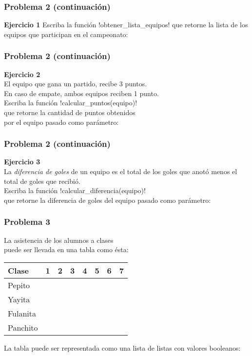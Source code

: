 \documentclass[12pt]{beamer}
\newcommand{\T}{\ding{51}}
\newcommand{\F}{}
\begin{document}
  \begin{frame}
    \frametitle{Problema 2 (continuación)}
    \label{problema-futbol-2}
    \textbf{Ejercicio 1}
    Escriba la función \li!obtener_lista_equipos!
    que retorne la lista de los equipos
    que participan en el campeonato:
    
  \end{frame}

  \begin{frame}
    \frametitle{Problema 2 (continuación)}
    \label{problema-futbol-3}
    \textbf{Ejercicio 2} \\
    El equipo que gana un partido, recibe 3 puntos. \\
    En caso de empate, ambos equipos reciben 1 punto. \\
    \vspace{1ex}
    Escriba la función \li!calcular_puntos(equipo)! \\
    que retorne la cantidad de puntos obtenidos \\
    por el equipo pasado como parámetro:
    
  \end{frame}

  \begin{frame}
    \frametitle{Problema 2 (continuación)}
    \label{problema-futbol-4}
    \textbf{Ejercicio 3} \\
    La \emph{diferencia de goles} de un equipo
    es el total de los goles que anotó menos el total de goles que recibió. \\
    \vspace{1ex}
    Escriba la función \li!calcular_diferencia(equipo)! \\
    que retorne la diferencia de goles
    del equipo pasado como parámetro:
    
  \end{frame}

  \begin{frame}
    \frametitle{Problema 3}
    \label{problema-asistencia-1}
    La asistencia de los alumnos a clases \\
    puede ser llevada en una tabla como ésta:
    {\footnotesize
    \begin{tabular}{|l|c|c|c|c|c|c|c|}\hline
      Clase    & 1& 2& 3& 4& 5& 6& 7\\\hline\hline
      Pepito   &\T&\T&\T&\F&\F&\F&\F\\\hline
      Yayita   &\T&\T&\T&\F&\T&\F&\T\\\hline
      Fulanita &\T&\T&\T&\T&\T&\T&\T\\\hline
      Panchito &\T&\T&\T&\F&\T&\T&\T\\\hline
    \end{tabular}
    }

    \vspace{1ex}
    La tabla puede ser representada como una lista de listas con valores booleanos:
    \footnotesize
    
  \end{frame}
\end{document}
